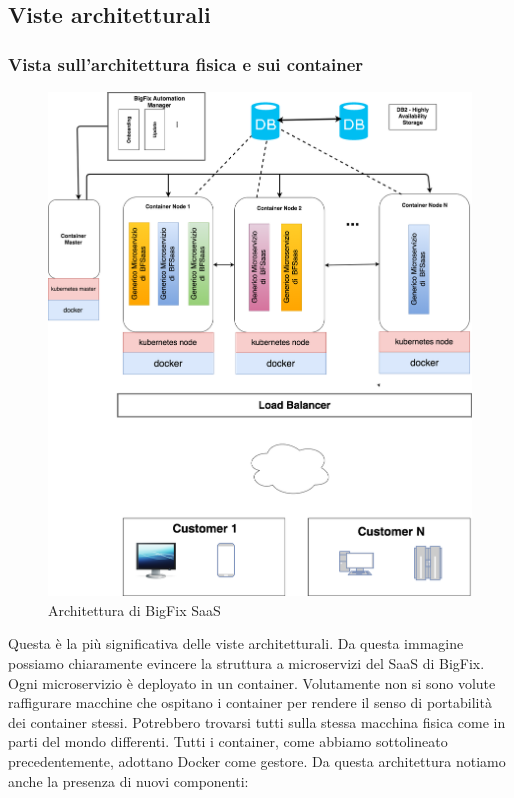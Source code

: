 \subsection{Viste architetturali}
\subsubsection{Vista sull'architettura fisica e sui container}
\begin{figure} [h!]
	\centering
	\includegraphics[width=1\linewidth]{capitoli/imgs/BfsaasArchitecture.png}
	\caption{Architettura di BigFix SaaS}
	\label{fig:arch}
\end{figure}
Questa è la più significativa delle viste architetturali. Da questa immagine possiamo chiaramente evincere la struttura a microservizi del SaaS di BigFix. Ogni microservizio è deployato in un container. Volutamente non si sono volute raffigurare macchine che ospitano i container per rendere il senso di portabilità dei container stessi. Potrebbero trovarsi tutti sulla stessa macchina fisica come in parti del mondo differenti. Tutti i container, come abbiamo sottolineato precedentemente, adottano Docker come gestore. Da questa architettura notiamo anche la presenza di nuovi componenti:
